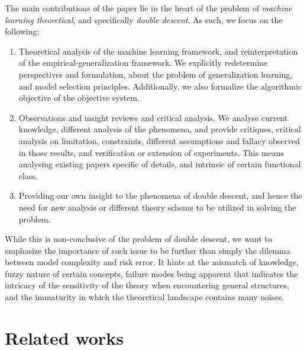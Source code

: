 \documentclass[
  journal=largetwo,
  year=2025,
  volume=37,
]{cup-journal}
\begin{document}
The main contributions of the paper lie in the heart of the problem of \textit{machine learning theoretical}, and specifically \textit{double descent}. As such, we focus on the following:
\begin{enumerate}
    \item Theoretical analysis of the machine learning framework, and reinterpretation of the empirical-generalization framework. We explicitly redetermine perspectives and formulation, about the problem of generalization learning, and model selection principles. Additionally, we also formalize the algorithmic objective of the objective system. 
    \item Observations and insight reviews and critical analysis. We analyse current knowledge, different analysis of the phenomena, and provide critiques, critical analysis on limitation, constraints, different assumptions and fallacy observed in those results, and verification or extension of experiments. This means analysing existing papers specific of details, and intrinsic of certain functional class.
    \item Providing our own insight to the phenomena of double descent, and hence the need for new analysis or different theory scheme to be utilized in solving the problem. 
\end{enumerate}
While this is non-conclusive of the problem of double descent, we want to emphasize the importance of such issue to be further than simply the dilemma between model complexity and risk error. It hints at the mismatch of knowledge, fuzzy nature of certain concepts, failure modes being apparent that indicates the intricacy of the sensitivity of the theory when encountering general structures, and the immaturity in which the theoretical landscape contains many noises. 

\section{Related works}
\end{document}
